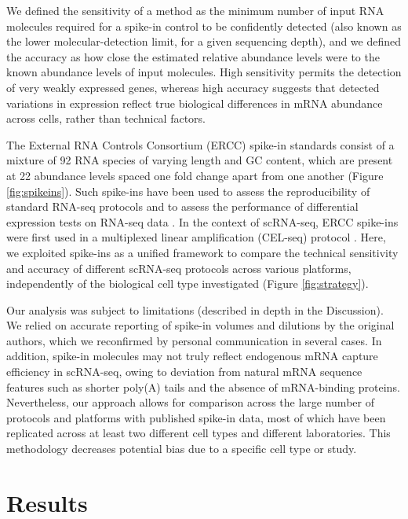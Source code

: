We defined the sensitivity of a method as the minimum number of input RNA molecules required for a spike-in control to be confidently detected (also known as the lower molecular-detection limit, for a given sequencing depth), and we defined the accuracy as how close the estimated relative abundance levels were to the known abundance levels of input molecules. High sensitivity permits the detection of very weakly expressed genes, whereas high accuracy suggests that detected variations in expression reflect true biological differences in mRNA abundance across cells, rather than technical factors.

The External RNA Controls Consortium (ERCC) \cite{External_RNA_Controls_Consortium2005-qi} spike-in standards consist of a mixture of 92 RNA species of varying length and GC content, which are present at 22 abundance levels spaced one fold change apart from one another (Figure \ref{fig:spikeins}). Such spike-ins have been used to assess the reproducibility of standard RNA-seq protocols \cite{Jiang2011-nc} and to assess the performance of differential expression tests on RNA-seq data  \cite{Munro2014-tu}. In the context of scRNA-seq, ERCC spike-ins were first used in a multiplexed linear amplification (CEL-seq) protocol \cite{Hashimshony2012-am}. Here, we exploited spike-ins as a unified framework to compare the technical sensitivity and accuracy of different scRNA-seq protocols across various platforms, independently of the biological cell type investigated (Figure \ref{fig:strategy}).

Our analysis was subject to limitations (described in depth in the Discussion). We relied on accurate reporting of spike-in volumes and dilutions by the original authors, which we reconfirmed by personal communication in several cases. In addition, spike-in molecules may not truly reflect endogenous mRNA capture efficiency in scRNA-seq, owing to deviation from natural mRNA sequence features such as shorter poly(A) tails and the absence of mRNA-binding proteins. Nevertheless, our approach allows for comparison across the large number of protocols and platforms with published spike-in data, most of which have been replicated across at least two different cell types and different laboratories. This methodology decreases potential bias due to a specific cell type or study.

\section{Results}

